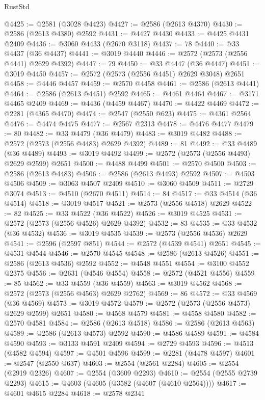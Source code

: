 \begin{lexlean}{RustStd}
\begin{coremodule}
@4425 := @2581 (@3028 @4423)
@4427 := @2586 (@2613 @4370)
@4430 := @2586 (@2613 @4380) @2592
@4431 := @4427 @4430
@4433 := @4425 @4431 @2409
@4436 := @3060 @4433 (@2670 @3118)
@4437 := 78
@4440 := @33 @4437 (@36 @4437)
@4441 := @3019 @4440
@4446 := @2572 (@2573 (@2556 @4441) @2629 @4392)
@4447 := 79
@4450 := @33 @4447 (@36 @4447)
@4451 := @3019 @4450
@4457 := @2572 (@2573 (@2556 @4451) @2629 @3048) @2651
@4458 := @4446 @4457
@4459 := @2570 @4458
@4461 := @2586 (@2613 @4441)
@4464 := @2586 (@2613 @4451) @2592
@4465 := @4461 @4464
@4467 := @3171 @4465 @2409
@4469 := @4436 (@4459 @4467)
@4470 := @4422 @4469
@4472 := @2281 (@4365 @4470)
@4474 := @2547 (@2550 @623)
@4475 := @4361 @2564
@4476 := @4474 @4475
@4477 := @2567 @2313
@4478 := @4476 @4477
@4479 := 80
@4482 := @33 @4479 (@36 @4479)
@4483 := @3019 @4482
@4488 := @2572 (@2573 (@2556 @4483) @2629 @4392)
@4489 := 81
@4492 := @33 @4489 (@36 @4489)
@4493 := @3019 @4492
@4499 := @2572 (@2573 (@2556 @4493) @2629 @2599) @2651
@4500 := @4488 @4499
@4501 := @2570 @4500
@4503 := @2586 (@2613 @4483)
@4506 := @2586 (@2613 @4493) @2592
@4507 := @4503 @4506
@4509 := @3063 @4507 @2409
@4510 := @3060 @4509
@4511 := @2729 @3074
@4513 := @4510 (@2670 @4511)
@4514 := 84
@4517 := @33 @4514 (@36 @4514)
@4518 := @3019 @4517
@4521 := @2573 (@2556 @4518) @2629
@4522 := 82
@4525 := @33 @4522 (@36 @4522)
@4526 := @3019 @4525
@4531 := @2572 (@2573 (@2556 @4526) @2629 @4392)
@4532 := 83
@4535 := @33 @4532 (@36 @4532)
@4536 := @3019 @4535
@4539 := @2573 (@2556 @4536) @2629
@4541 := @2596 (@2597 @851)
@4544 := @2572 (@4539 @4541) @2651
@4545 := @4531 @4544
@4546 := @2570 @4545
@4548 := @2586 (@2613 @4526)
@4551 := @2586 (@2613 @4536) @2592
@4552 := @4548 @4551
@4554 := @3100 @4552 @2375
@4556 := @2631 (@4546 @4554)
@4558 := @2572 (@4521 @4556)
@4559 := 85
@4562 := @33 @4559 (@36 @4559)
@4563 := @3019 @4562
@4568 := @2572 (@2573 (@2556 @4563) @2629 @2762)
@4569 := 86
@4572 := @33 @4569 (@36 @4569)
@4573 := @3019 @4572
@4579 := @2572 (@2573 (@2556 @4573) @2629 @2599) @2651
@4580 := @4568 @4579
@4581 := @4558 @4580
@4582 := @2570 @4581
@4584 := @2586 (@2613 @4518)
@4586 := @2586 (@2613 @4563)
@4589 := @2586 (@2613 @4573) @2592
@4590 := @4586 @4589
@4591 := @4584 @4590
@4593 := @3133 @4591 @2409
@4594 := @2729 @4593
@4596 := @4513 (@4582 @4594)
@4597 := @4501 @4596
@4599 := @2281 (@4478 @4597)
@4601 := @2547 (@2550 @637)
@4603 := @2554 (@2561 @2284)
@4605 := @2554 (@2919 @2326)
@4607 := @2554 (@3609 @2293)
@4610 := @2554 (@2555 @2739 @2293)
@4615 := @4603 (@4605 (@3582 (@4607 (@4610 @2564))))
@4617 := @4601 @4615 @2284
@4618 := @2578 @2341

\end{coremodule}
\end{lexlean}
